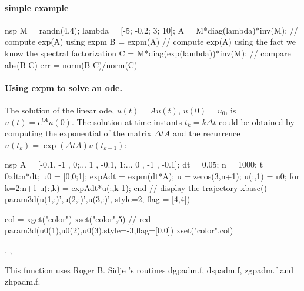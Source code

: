 \begin{examples}

\paragraph{simple example}
\begin{mintednsp}{nsp}
M = randn(4,4);
lambda = [-5; -0.2; 3; 10];
A = M*diag(lambda)*inv(M);
// compute exp(A) using expm 
B = expm(A)
// compute exp(A) using the fact we know the spectral factorization
C =  M*diag(exp(lambda))*inv(M);
// compare
abs(B-C)
err = norm(B-C)/norm(C)
\end{mintednsp}

\paragraph{Using expm to solve an ode.} The solution of the linear ode, $\dot{u}(t) = A u(t)$, $u(0)=u_0$,
is $u(t) = e^{tA} u(0)$. The solution at time instants $t_k = k \Delta t$ could be
obtained by computing the exponential of the matrix $\Delta t A$ and the recurrence 
$u(t_k) = \exp(\Delta t A) u(t_{k-1})$:  
\begin{mintednsp}{nsp}
A = [-0.1, -1  ,  0;...
      1  , -0.1,  1;...
      0  , -1  , -0.1];
dt = 0.05;
n = 1000;
t = 0:dt:n*dt;
u0 = [0;0;1];
expAdt = expm(dt*A);
u = zeros(3,n+1);
u(:,1) = u0;
for k=2:n+1
  u(:,k) = expAdt*u(:,k-1);
end
// display the trajectory
xbasc()
param3d(u(1,:)',u(2,:)',u(3,:)', style=2, flag = [4,4])

col = xget("color")
xset("color",5) // red
param3d(u0(1),u0(2),u0(3),style=-3,flag=[0,0]) 
xset("color",col)
\end{mintednsp}
\end{examples}

\begin{manseealso}
  , ,   
\end{manseealso}

\begin{authors}
  This function uses Roger B. Sidje 's routines dgpadm.f, dspadm.f, zgpadm.f and zhpadm.f.
\end{authors}
